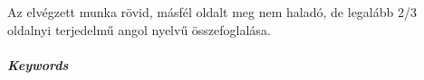 \chapter*{\summary}

\selectforeignlanguage %

Az elvégzett munka rövid, másfél oldalt meg nem haladó, de legalább 2/3 
oldalnyi terjedelmű angol nyelvű összefoglalása.


\vspace{0.5cm}
\paragraph{Keywords} \emph{\keywords}  %


\selectthesislanguage %
